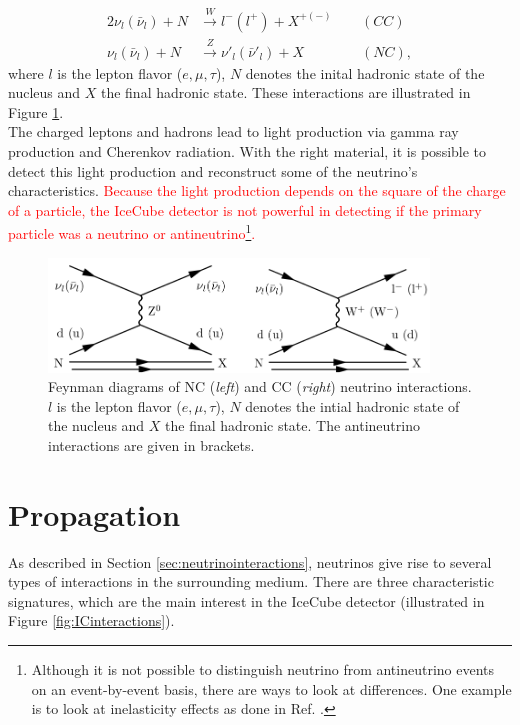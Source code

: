 \begin{alignat}{2}
\nu_l \left(\bar{\nu}_l\right) + N &\xrightarrow{W} l^- \left(l^+\right) + X^{+\left(-\right)} \ \ && \left(CC\right)\\
\nu_l \left(\bar{\nu}_l\right) + N &\xrightarrow{Z} \nu'_l \left(\bar{\nu}'_l\right) + X && \left(NC\right),
\end{alignat}
where $l$ is the lepton flavor ($e,\mu,\tau$), $N$ denotes the inital hadronic state of the nucleus and $X$ the final hadronic state. These interactions are illustrated in Figure \ref{fig:feynmanneutrino}.\\
\newline
The charged leptons and hadrons lead to light production via gamma ray production and Cherenkov radiation. With the right material, it is possible to detect this light production and reconstruct some of the neutrino's characteristics. \textcolor{red}{Because the light production depends on the square of the charge of a particle, the IceCube detector is not powerful in detecting if the primary particle was a neutrino or antineutrino\footnote{Although it is not possible to distinguish neutrino from antineutrino events on an event-by-event basis, there are ways to look at differences. One example is to look at inelasticity effects as done in Ref. \cite{Aartsen:2018vez}.}.}

\begin{figure}[t]
\centering
\includegraphics[width = 0.9\textwidth]{chapter4/img/feynmanneutrino.png}
\caption{Feynman diagrams of NC (\textit{left}) and CC (\textit{right}) neutrino interactions. $l$ is the lepton flavor ($e,\mu,\tau$), $N$ denotes the intial hadronic state of the nucleus and $X$ the final hadronic state. The antineutrino interactions are given in brackets.}
\label{fig:feynmanneutrino}
\end{figure}


\section{Propagation}
\label{sec:propagation}
As described in Section \ref{sec:neutrinointeractions}, neutrinos give rise to several types of interactions in the surrounding medium. There are three characteristic signatures, which are the main interest in the IceCube detector (illustrated in Figure \ref{fig:ICinteractions}).

